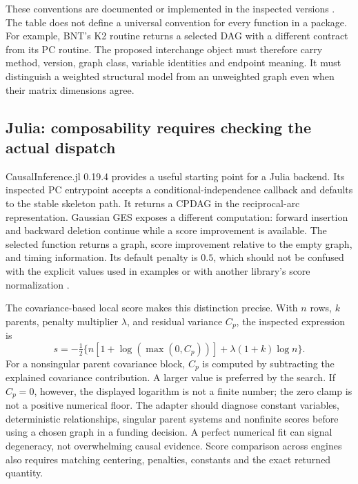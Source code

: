 These conventions are documented or implemented in the inspected versions
\citep{exec13_other_causalinference,exec13_other_associations,exec13_other_recursive,
exec13_other_flopsearch,exec13_other_generalized,exec13_other_bnt}.
The table does not define a universal convention for every function in a
package. For example, BNT's K2 routine returns a selected DAG with a different
contract from its PC routine. The proposed interchange object must therefore
carry method, version, graph class, variable identities and endpoint meaning.
It must distinguish a weighted structural model from an unweighted graph
even when their matrix dimensions agree.

\subsection{Julia: composability requires checking the actual dispatch}

CausalInference.jl 0.19.4 provides a useful starting point for a Julia
backend. Its inspected PC entrypoint accepts a conditional-independence
callback and defaults to the stable skeleton path. It returns a CPDAG in the
reciprocal-arc representation. Gaussian GES exposes a different computation:
forward insertion and backward deletion continue while a score improvement
is available. The selected function returns a graph, score improvement
relative to the empty graph, and timing information. Its default penalty is
$0.5$, which should not be confused with the explicit values used in examples
or with another library's score normalization
\citep{exec13_other_causalinference}.

The covariance-based local score makes this distinction precise. With $n$
rows, $k$ parents, penalty multiplier $\lambda$, and residual variance $C_p$,
the inspected expression is
\[
 s=-\tfrac12\{n[1+\log(\max(0,C_p))]
                +\lambda(1+k)\log n\}.
\]
For a nonsingular parent covariance block, $C_p$ is computed by subtracting
the explained covariance contribution. A larger value is preferred by the
search. If $C_p=0$, however, the displayed logarithm is not a finite number;
the zero clamp is not a positive numerical floor. The adapter should diagnose
constant variables, deterministic relationships, singular parent systems and
nonfinite scores before using a chosen graph in a funding decision. A
perfect numerical fit can signal degeneracy, not overwhelming causal
evidence. Score comparison across engines also requires matching centering,
penalties, constants and the exact returned quantity.

